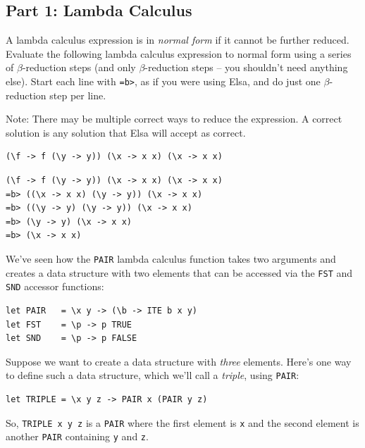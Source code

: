 \documentclass[addpoints]{exam}
\begin{document}
\begin{questions}

\subsection*{\textbf{Part 1: Lambda Calculus}}

\question[4] A lambda calculus expression is in \emph{normal form} if it cannot be further reduced.  Evaluate the following lambda calculus expression to normal form using a series of $\beta$-reduction steps (and only $\beta$-reduction steps -- you shouldn't need anything else).  Start each line with \texttt{=b>}, as if you were using Elsa, and do just one $\beta$-reduction step per line.

Note: There may be multiple correct ways to reduce the expression.  A correct solution is any solution that Elsa will accept as correct.

\begin{verbatim}
(\f -> f (\y -> y)) (\x -> x x) (\x -> x x)
\end{verbatim}
\begin{solutionorbox}[5in]
\begin{verbatim}
(\f -> f (\y -> y)) (\x -> x x) (\x -> x x)
=b> ((\x -> x x) (\y -> y)) (\x -> x x)
=b> ((\y -> y) (\y -> y)) (\x -> x x)
=b> (\y -> y) (\x -> x x)
=b> (\x -> x x)
\end{verbatim}
\end{solutionorbox}

\newpage

\question

We've seen how the \verb|PAIR| lambda calculus function takes two arguments and creates a data structure with two elements that can be accessed via the \verb|FST| and \verb|SND| accessor functions:

\begin{verbatim}
let PAIR   = \x y -> (\b -> ITE b x y)
let FST    = \p -> p TRUE
let SND    = \p -> p FALSE
\end{verbatim}

Suppose we want to create a data structure with \emph{three} elements.  Here's one way to define such a data structure, which we'll call a \emph{triple}, using \verb|PAIR|:

\begin{verbatim}
let TRIPLE = \x y z -> PAIR x (PAIR y z)
\end{verbatim}

So, \verb|TRIPLE x y z| is a \verb|PAIR| where the first element is \verb|x| and the second element is another \verb|PAIR| containing \verb|y| and \verb|z|.


\end{questions}
\end{document}
